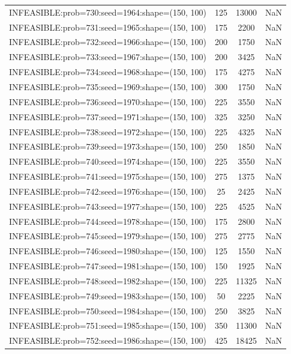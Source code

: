 \begin{longtable}{lccc}
INFEASIBLE:prob=730:seed=1964:shape=(150, 100) &      125 & 13000 &    NaN \\
INFEASIBLE:prob=731:seed=1965:shape=(150, 100) &      175 &  2200 &    NaN \\
INFEASIBLE:prob=732:seed=1966:shape=(150, 100) &      200 &  1750 &    NaN \\
INFEASIBLE:prob=733:seed=1967:shape=(150, 100) &      200 &  3425 &    NaN \\
INFEASIBLE:prob=734:seed=1968:shape=(150, 100) &      175 &  4275 &    NaN \\
INFEASIBLE:prob=735:seed=1969:shape=(150, 100) &      300 &  1750 &    NaN \\
INFEASIBLE:prob=736:seed=1970:shape=(150, 100) &      225 &  3550 &    NaN \\
INFEASIBLE:prob=737:seed=1971:shape=(150, 100) &      325 &  3250 &    NaN \\
INFEASIBLE:prob=738:seed=1972:shape=(150, 100) &      225 &  4325 &    NaN \\
INFEASIBLE:prob=739:seed=1973:shape=(150, 100) &      250 &  1850 &    NaN \\
INFEASIBLE:prob=740:seed=1974:shape=(150, 100) &      225 &  3550 &    NaN \\
INFEASIBLE:prob=741:seed=1975:shape=(150, 100) &      275 &  1375 &    NaN \\
INFEASIBLE:prob=742:seed=1976:shape=(150, 100) &       25 &  2425 &    NaN \\
INFEASIBLE:prob=743:seed=1977:shape=(150, 100) &      225 &  4525 &    NaN \\
INFEASIBLE:prob=744:seed=1978:shape=(150, 100) &      175 &  2800 &    NaN \\
INFEASIBLE:prob=745:seed=1979:shape=(150, 100) &      275 &  2775 &    NaN \\
INFEASIBLE:prob=746:seed=1980:shape=(150, 100) &      125 &  1550 &    NaN \\
INFEASIBLE:prob=747:seed=1981:shape=(150, 100) &      150 &  1925 &    NaN \\
INFEASIBLE:prob=748:seed=1982:shape=(150, 100) &      225 & 11325 &    NaN \\
INFEASIBLE:prob=749:seed=1983:shape=(150, 100) &       50 &  2225 &    NaN \\
INFEASIBLE:prob=750:seed=1984:shape=(150, 100) &      250 &  3825 &    NaN \\
INFEASIBLE:prob=751:seed=1985:shape=(150, 100) &      350 & 11300 &    NaN \\
INFEASIBLE:prob=752:seed=1986:shape=(150, 100) &      425 & 18425 &    NaN \\

\end{longtable}
